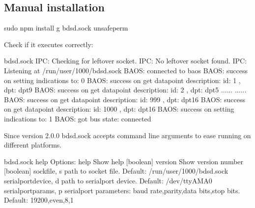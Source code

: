 \documentclass[letterpaper,10pt,english]{sphinxmanual}
\begin{document}
\subsection{Manual installation}
\label{\detokenize{bdsd.sock:manual-installation}}\label{\detokenize{bdsd.sock:manual-installation}}

%
\begin{sphinxVerbatim}[commandchars=\\\{\}]
\PYGZdl{} sudo npm install \PYGZhy{}g bdsd.sock \PYGZhy{}\PYGZhy{}unsafe\PYGZhy{}perm
\end{sphinxVerbatim}

Check if it executes correctly:

%
\begin{sphinxVerbatim}[commandchars=\\\{\}]
\PYGZdl{} bdsd.sock
IPC: Checking for leftover socket.
IPC: No leftover socket found.
IPC: Listening at  /run/user/1000/bdsd.sock
BAOS: connected to baos
BAOS: success on setting indications to: 0
BAOS: success on get datapoint description: \PYGZob{} id: 1 , dpt:  dpt9 \PYGZcb{}
BAOS: success on get datapoint description: \PYGZob{} id: 2 , dpt:  dpt5 \PYGZcb{}
......
......
BAOS: success on get datapoint description: \PYGZob{} id: 999 , dpt:  dpt16 \PYGZcb{}
BAOS: success on get datapoint description: \PYGZob{} id: 1000 , dpt:  dpt16 \PYGZcb{}
BAOS: success on setting indications to: 1
BAOS: got bus state: connected
\end{sphinxVerbatim}

Since version 2.0.0 bdsd.sock accepts command line arguments to ease running on different platforms.

%
\begin{sphinxVerbatim}[commandchars=\\\{\}]
\PYGZdl{} bdsd.sock \PYGZhy{}\PYGZhy{}help
Options:
  \PYGZhy{}\PYGZhy{}help                   Show help                                   [boolean]
  \PYGZhy{}\PYGZhy{}version                Show version number                         [boolean]
  \PYGZhy{}\PYGZhy{}sockfile, \PYGZhy{}s           path to socket file. Default:
                           /run/user/1000/bdsd.sock\PYGZsq{}
  \PYGZhy{}\PYGZhy{}serialport\PYGZhy{}device, \PYGZhy{}d  path to serialport device. Default: /dev/ttyAMA0
  \PYGZhy{}\PYGZhy{}serialport\PYGZhy{}params, \PYGZhy{}p  serialport parameters: \PYGZdq{}baud rate,parity,data
                           bits,stop bits\PYGZdq{}. Default: \PYGZdq{}19200,even,8,1\PYGZdq{}
\end{sphinxVerbatim}
\end{document}

